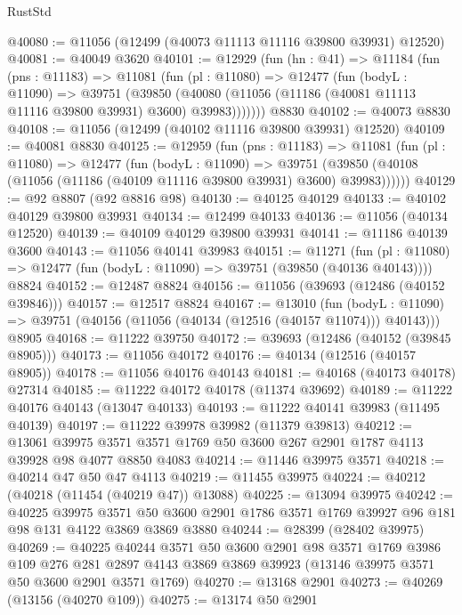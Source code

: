 \begin{lexlean}{RustStd}
\begin{coremodule}
@40080 := @11056 (@12499 (@40073 @11113 @11116 @39800 @39931) @12520)
@40081 := @40049 @3620
@40101 := @12929
    (fun (hn : @41) =>
    @11184
      (fun (pns : @11183) =>
      @11081
        (fun (pl : @11080) =>
        @12477
          (fun (bodyL : @11090) =>
          @39751
            (@39850
              (@40080 (@11056 (@11186 (@40081 @11113 @11116 @39800 @39931) @3600) @39983)))))))
    @8830
@40102 := @40073 @8830
@40108 := @11056 (@12499 (@40102 @11116 @39800 @39931) @12520)
@40109 := @40081 @8830
@40125 := @12959
    (fun (pns : @11183) =>
    @11081
      (fun (pl : @11080) =>
      @12477
        (fun (bodyL : @11090) =>
        @39751 (@39850 (@40108 (@11056 (@11186 (@40109 @11116 @39800 @39931) @3600) @39983))))))
@40129 := @92 @8807 (@92 @8816 @98)
@40130 := @40125 @40129
@40133 := @40102 @40129 @39800 @39931
@40134 := @12499 @40133
@40136 := @11056 (@40134 @12520)
@40139 := @40109 @40129 @39800 @39931
@40141 := @11186 @40139 @3600
@40143 := @11056 @40141 @39983
@40151 := @11271
    (fun (pl : @11080) => @12477 (fun (bodyL : @11090) => @39751 (@39850 (@40136 @40143))))
    @8824
@40152 := @12487 @8824
@40156 := @11056 (@39693 (@12486 (@40152 @39846)))
@40157 := @12517 @8824
@40167 := @13010
    (fun (bodyL : @11090) => @39751 (@40156 (@11056 (@40134 (@12516 (@40157 @11074))) @40143)))
    @8905
@40168 := @11222 @39750
@40172 := @39693 (@12486 (@40152 (@39845 @8905)))
@40173 := @11056 @40172
@40176 := @40134 (@12516 (@40157 @8905))
@40178 := @11056 @40176 @40143
@40181 := @40168 (@40173 @40178) @27314
@40185 := @11222 @40172 @40178 (@11374 @39692)
@40189 := @11222 @40176 @40143 (@13047 @40133)
@40193 := @11222 @40141 @39983 (@11495 @40139)
@40197 := @11222 @39978 @39982 (@11379 @39813)
@40212 := @13061
    @39975
    @3571
    @3571
    @1769
    @50
    @3600
    @267
    @2901
    @1787
    @4113
    @39928
    @98
    @4077
    @8850
    @4083
@40214 := @11446 @39975 @3571
@40218 := @40214 @47 @50 @47 @4113
@40219 := @11455 @39975
@40224 := @40212 (@40218 (@11454 (@40219 @47)) @13088)
@40225 := @13094 @39975
@40242 := @40225
    @39975
    @3571
    @50
    @3600
    @2901
    @1786
    @3571
    @1769
    @39927
    @96
    @181
    @98
    @131
    @4122
    @3869
    @3869
    @3880
@40244 := @28399 (@28402 @39975)
@40269 := @40225
    @40244
    @3571
    @50
    @3600
    @2901
    @98
    @3571
    @1769
    @3986
    @109
    @276
    @281
    @2897
    @4143
    @3869
    @3869
    @39923
    (@13146 @39975 @3571 @50 @3600 @2901 @3571 @1769)
@40270 := @13168 @2901
@40273 := @40269 (@13156 (@40270 @109))
@40275 := @13174 @50 @2901

\end{coremodule}
\end{lexlean}
